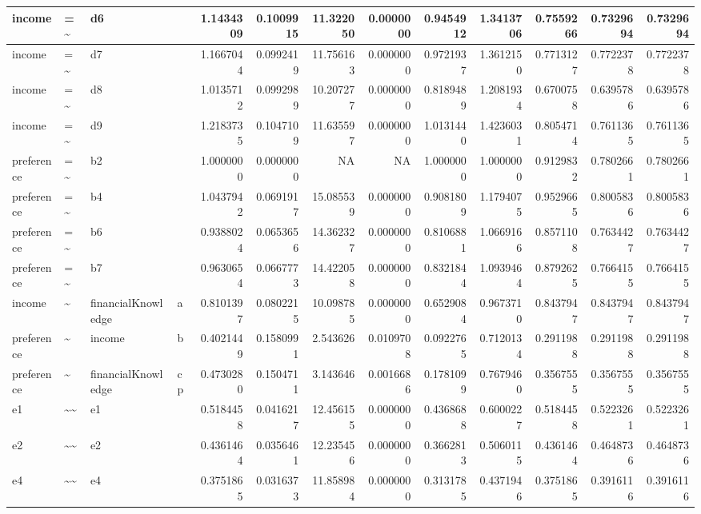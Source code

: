 \documentclass[
  super,
  preprint,
  3p]{elsarticle}
\begin{document}
\begin{tabular}{l|l|l|l|r|r|r|r|r|r|r|r|r}
\hline
income & =\textasciitilde{} & d6 &  & 1.1434309 & 0.1009915 & 11.322050 & 0.0000000 & 0.9454912 & 1.3413706 & 0.7559266 & 0.7329694 & 0.7329694\\
\hline
income & =\textasciitilde{} & d7 &  & 1.1667044 & 0.0992419 & 11.756163 & 0.0000000 & 0.9721937 & 1.3612150 & 0.7713127 & 0.7722378 & 0.7722378\\
\hline
income & =\textasciitilde{} & d8 &  & 1.0135712 & 0.0992989 & 10.207277 & 0.0000000 & 0.8189489 & 1.2081934 & 0.6700758 & 0.6395786 & 0.6395786\\
\hline
income & =\textasciitilde{} & d9 &  & 1.2183735 & 0.1047109 & 11.635597 & 0.0000000 & 1.0131440 & 1.4236031 & 0.8054714 & 0.7611365 & 0.7611365\\
\hline
preference & =\textasciitilde{} & b2 &  & 1.0000000 & 0.0000000 & NA & NA & 1.0000000 & 1.0000000 & 0.9129832 & 0.7802661 & 0.7802661\\
\hline
preference & =\textasciitilde{} & b4 &  & 1.0437942 & 0.0691917 & 15.085539 & 0.0000000 & 0.9081809 & 1.1794075 & 0.9529665 & 0.8005836 & 0.8005836\\
\hline
preference & =\textasciitilde{} & b6 &  & 0.9388024 & 0.0653656 & 14.362327 & 0.0000000 & 0.8106881 & 1.0669166 & 0.8571108 & 0.7634427 & 0.7634427\\
\hline
preference & =\textasciitilde{} & b7 &  & 0.9630654 & 0.0667773 & 14.422058 & 0.0000000 & 0.8321844 & 1.0939464 & 0.8792625 & 0.7664155 & 0.7664155\\
\hline
income & \textasciitilde{} & financialKnowledge & a & 0.8101397 & 0.0802215 & 10.098785 & 0.0000000 & 0.6529084 & 0.9673710 & 0.8437947 & 0.8437947 & 0.8437947\\
\hline
preference & \textasciitilde{} & income & b & 0.4021449 & 0.1580991 & 2.543626 & 0.0109708 & 0.0922765 & 0.7120134 & 0.2911988 & 0.2911988 & 0.2911988\\
\hline
preference & \textasciitilde{} & financialKnowledge & cp & 0.4730280 & 0.1504711 & 3.143646 & 0.0016686 & 0.1781099 & 0.7679460 & 0.3567555 & 0.3567555 & 0.3567555\\
\hline
e1 & \textasciitilde{}\textasciitilde{} & e1 &  & 0.5184458 & 0.0416217 & 12.456155 & 0.0000000 & 0.4368688 & 0.6000227 & 0.5184458 & 0.5223261 & 0.5223261\\
\hline
e2 & \textasciitilde{}\textasciitilde{} & e2 &  & 0.4361464 & 0.0356461 & 12.235456 & 0.0000000 & 0.3662813 & 0.5060115 & 0.4361464 & 0.4648736 & 0.4648736\\
\hline
e4 & \textasciitilde{}\textasciitilde{} & e4 &  & 0.3751865 & 0.0316373 & 11.858984 & 0.0000000 & 0.3131785 & 0.4371946 & 0.3751865 & 0.3916116 & 0.3916116\\

\end{tabular}
\end{document}
